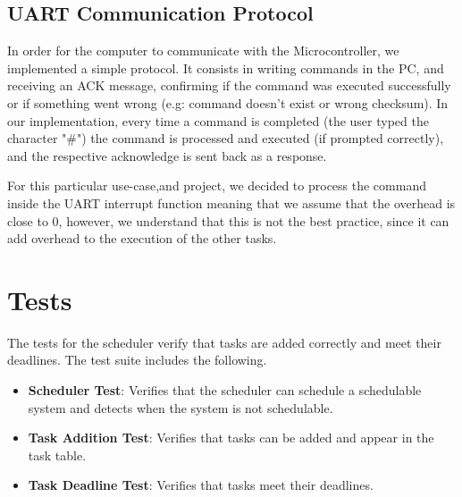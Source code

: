 \documentclass[a4paper,12pt]{article}
\begin{document}
\subsection{UART Communication Protocol}
In order for the computer to communicate with the Microcontroller, we implemented a simple protocol. It consists in writing commands in the PC, and receiving an ACK message, confirming if the command was executed successfully or if something went wrong (e.g: command doesn't exist or wrong checksum).
In our implementation, every time a command is completed (the user typed the character "\#") the command is processed and executed (if prompted correctly), and the respective acknowledge is sent back as a response.

For this particular use-case,and project, we decided to process the command inside the UART interrupt function meaning that we assume that the overhead is close to 0, however, we understand that this is not the best practice, since it can add overhead to the execution of the other tasks.

\section{Tests}
The tests for the scheduler verify that tasks are added correctly and meet their deadlines. The test suite includes the following.
\begin{itemize}
    \item \textbf{Scheduler Test}: Verifies that the scheduler can schedule a schedulable system and detects when the system is not schedulable.
    \item \textbf{Task Addition Test}: Verifies that tasks can be added and appear in the task table.
    \item \textbf{Task Deadline Test}: Verifies that tasks meet their deadlines.
\end{itemize}
\end{document}
